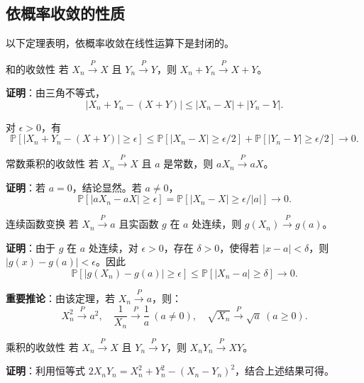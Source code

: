 \subsection{依概率收敛的性质}

以下定理表明，依概率收敛在线性运算下是封闭的。

\begin{theorem}{和的收敛性}\label{th:convergence-sum}
若 $X_n \xrightarrow{P} X$ 且 $Y_n \xrightarrow{P} Y$，则 $X_n + Y_n \xrightarrow{P} X + Y$。
\end{theorem}

\textbf{证明}：由三角不等式，
\[
|X_n + Y_n - (X + Y)| \leq |X_n - X| + |Y_n - Y|.
\]

对 $\epsilon > 0$，有
\[
\mathbb{P}[|X_n + Y_n - (X + Y)| \geq \epsilon] \leq \mathbb{P}[|X_n - X| \geq \epsilon/2] + \mathbb{P}[|Y_n - Y| \geq \epsilon/2] \to 0.
\label{eq:convergence-sum-proof}
\]

\begin{theorem}{常数乘积的收敛性}\label{th:convergence-scalar}
若 $X_n \xrightarrow{P} X$ 且 $a$ 是常数，则 $aX_n \xrightarrow{P} aX$。
\end{theorem}

\textbf{证明}：若 $a = 0$，结论显然。若 $a \neq 0$，
\[
\mathbb{P}[|aX_n - aX| \geq \epsilon] = \mathbb{P}[|X_n - X| \geq \epsilon/|a|] \to 0.
\label{eq:convergence-scalar-proof}
\]

\begin{theorem}{连续函数变换}\label{th:continuous-mapping}
若 $X_n \xrightarrow{P} a$ 且实函数 $g$ 在 $a$ 处连续，则 $g(X_n) \xrightarrow{P} g(a)$。
\end{theorem}

\textbf{证明}：由于 $g$ 在 $a$ 处连续，对 $\epsilon > 0$，存在 $\delta > 0$，使得若 $|x - a| < \delta$，则 $|g(x) - g(a)| < \epsilon$。因此
\[
\mathbb{P}[|g(X_n) - g(a)| \geq \epsilon] \leq \mathbb{P}[|X_n - a| \geq \delta] \to 0.
\label{eq:continuous-mapping-proof}
\]

\textbf{重要推论}：由该定理，若 $X_n \xrightarrow{P} a$，则：
\[
X_n^2 \xrightarrow{P} a^2,\quad \frac{1}{X_n} \xrightarrow{P} \frac{1}{a}\ (a \neq 0),\quad \sqrt{X_n} \xrightarrow{P} \sqrt{a}\ (a \geq 0).
\]

\begin{theorem}{乘积的收敛性}\label{th:convergence-product}
若 $X_n \xrightarrow{P} X$ 且 $Y_n \xrightarrow{P} Y$，则 $X_n Y_n \xrightarrow{P} XY$。
\end{theorem}

\textbf{证明}：利用恒等式 $2X_nY_n = X_n^2 + Y_n^2 - (X_n - Y_n)^2$，结合上述结果可得。%

